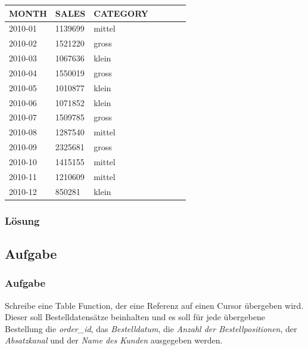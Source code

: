 \begin{table}[H]
  \centering
  \ttfamily
  \begin{tabular}{|l|l|l|l|l|l|l|}
    \hline
    \textbf{MONTH}   & \textbf{SALES}   & \textbf{CATEGORY} \\
    \hline
    2010-01 & 1139699 & mittel \\
    2010-02 & 1521220 & gross \\
    2010-03 & 1067636 & klein \\
    2010-04 & 1550019 & gross \\
    2010-05 & 1010877 & klein \\
    2010-06 & 1071852 & klein \\
    2010-07 & 1509785 & gross \\
    2010-08 & 1287540 & mittel \\
    2010-09 & 2325681 & gross \\
    2010-10 & 1415155 & mittel \\
    2010-11 & 1210609 & mittel \\
    2010-12 & 850281  & klein \\
     \hline
  \end{tabular}
\end{table}

\subsubsection*{Lösung}
\label{subsubsec:uebung_12.aufgabe_13.loesung}


\subsection{Aufgabe}
\label{subsec:uebung_12.aufgabe_14}

\subsubsection{Aufgabe}
\label{subsubsec:uebung_12.aufgabe_14a}
Schreibe eine Table Function, der eine Referenz auf einen Cursor übergeben wird. Dieser soll Bestelldatensätze beinhalten und es soll für jede übergebene Bestellung die \textit{order\_id}, das \textit{Bestelldatum}, die \textit{Anzahl der Bestellpositionen}, der \textit{Absatzkanal} und der \textit{Name des Kunden} ausgegeben werden.

